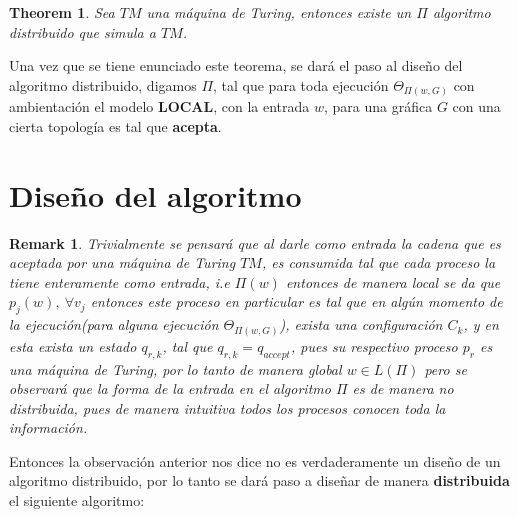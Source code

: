 \documentclass[10pt]{report}
\newtheorem*{remark}{Remark}
\newtheorem{theorem}{Theorem}
\begin{document}

    \begin{theorem}
        Sea $TM$ una máquina de Turing, entonces existe un $\Pi$ algoritmo distribuido que simula
        a $TM$.
    \end{theorem}
    Una vez que se tiene enunciado este teorema, se dará el paso al diseño del algoritmo distribuido,
    digamos $\Pi$, tal que para toda ejecución $\Theta_{\Pi(w,G)}$ con ambientación el modelo \textbf{LOCAL}, con la entrada $w$, para una gráfica $G$ con una
    cierta topología es tal que \textbf{acepta}.
    \newpage

    \section{Diseño del algoritmo}\label{sec:diseño-del-algoritmo}
    \begin{remark}
        Trivialmente se pensará que al darle como entrada la cadena que es aceptada por una máquina de Turing $TM$,\space
        es consumida tal que cada proceso la tiene enteramente como entrada, i.e $\Pi(w)$ entonces de manera local se da
        que $p_{j}(w),\ \forall v_{j}$ entonces este proceso en particular es tal que en algún momento de la ejecución(para alguna ejecución $\Theta_{\Pi(w,G)}$),
        exista una configuración $C_{k}$, y en esta exista un estado $q_{r,k}$, tal que $q_{r,k} = q_{accept}$, pues su respectivo proceso $p_{r}$ es una máquina de Turing,
        por lo tanto de manera global $w\in L(\Pi)$ pero se observará que la forma de la entrada en el algoritmo $\Pi$
        es de manera no distribuida, pues de manera intuitiva todos los procesos conocen toda la información.
    \end{remark}
    Entonces la observación anterior nos dice no es verdaderamente un diseño de un algoritmo distribuido, por lo tanto se dará paso a diseñar de manera
    \textbf{distribuida} el siguiente algoritmo:
    \newline
\end{document}
